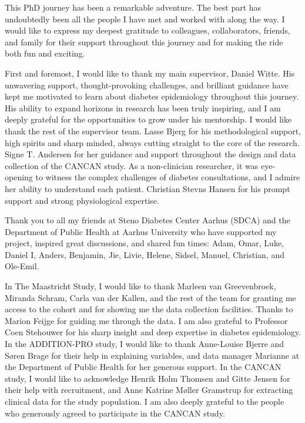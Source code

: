 \documentclass[
  letterpaper,
  headsepline=true,
  open=any]{scrbook}
\begin{document}

This PhD journey has been a remarkable adventure. The best part has
undoubtedly been all the people I have met and worked with along the
way. I would like to express my deepest gratitude to colleagues,
collaborators, friends, and family for their support throughout this
journey and for making the ride both fun and exciting.

First and foremost, I would like to thank my main supervisor, Daniel
Witte. His unwavering support, thought-provoking challenges, and
brilliant guidance have kept me motivated to learn about diabetes
epidemiology throughout this journey. His ability to expand horizons in
research has been truly inspiring, and I am deeply grateful for the
opportunities to grow under his mentorship. I would like thank the rest
of the supervisor team. Lasse Bjerg for his methodological support, high
spirits and sharp minded, always cutting straight to the core of the
research. Signe T. Andersen for her guidance and support throughout the
design and data collection of the CANCAN study. As a non-clinician
researcher, it was eye-opening to witness the complex challenges of
diabetes consultations, and I admire her ability to understand each
patient. Christian Stevns Hansen for his prompt support and strong
physiological expertise.

Thank you to all my friends at Steno Diabetes Center Aarhus (SDCA) and
the Department of Public Health at Aarhus University who have supported
my project, inspired great discussions, and shared fun times: Adam,
Omar, Luke, Daniel I, Anders, Benjamin, Jie, Livie, Helene, Sidsel,
Manuel, Christian, and Ole-Emil.

In The Maastricht Study, I would like to thank Marleen van Greevenbroek,
Miranda Schram, Carla van der Kallen, and the rest of the team for
granting me access to the cohort and for showing me the data collection
facilities. Thanks to Marion Feijge for guiding me through the data. I
am also grateful to Professor Coen Stehouwer for his sharp insight and
deep expertise in diabetes epidemiology. In the ADDITION-PRO study, I
would like to thank Anne-Louise Bjerre and Søren Brage for their help in
explaining variables, and data manager Marianne at the Department of
Public Health for her generous support. In the CANCAN study, I would
like to acknowledge Henrik Holm Thomsen and Gitte Jensen for their help
with recruitment, and Anne Katrine Møller Gramstrup for extracting
clinical data for the study population. I am also deeply grateful to the
people who generously agreed to participate in the CANCAN study.
\end{document}
